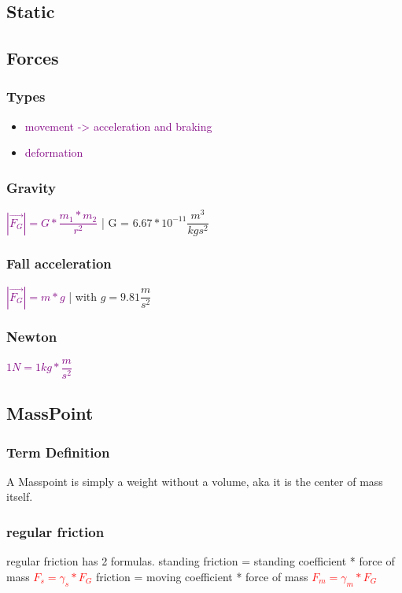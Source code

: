 \documentclass[main.tex,fontsize=8pt,paper=a4,paper=portrait,DIV=calc,]{scrartcl}
\begin{document}
\begin{multicols*}{2}
\section{Static}
\subsection{Forces}
\subsubsection{Types}
\vspace{2mm}
\begin{itemize}
\item \textcolor{purple}{movement -> acceleration and braking}
\item \textcolor{purple}{deformation}

\end{itemize}

\subsubsection{Gravity}
\textcolor{purple}{\( |\vec{F_G}| = G * \dfrac{m_1 * m_2}{r^2} \)} | 
G = \(6.67 * 10^{-11}\dfrac{m^3}{kgs^2}\)\vspace{2mm}

\subsubsection{Fall acceleration}
\textcolor{purple}{\(|\vec{F_G}| = m * g\)} | with \(g = 9.81\dfrac{m}{s^2}\)

\subsubsection{Newton}
\textcolor{purple}{\(1N = 1kg * \dfrac{m}{s^2}\)}\vspace{2mm}

\subsection{MassPoint}
\subsubsection{Term Definition} 
A Masspoint is simply a weight without a volume, aka it is the center of mass itself.

\subsubsection{regular friction}
regular friction has 2 formulas. \newline
standing friction = standing coefficient * force of mass \newline
\large \textcolor{red}{\(F_{s} = \gamma_s * F_G\)}\newline 
\normalsize friction = moving coefficient * force of mass \newline 
\large\textcolor{red}{\(F_{m} = \gamma_m * F_G\)} \normalsize\newline
{}


\end{multicols*}
\end{document}
